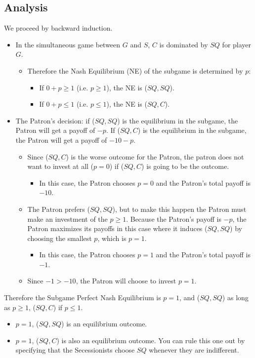 \documentclass[12pt]{article}
\begin{document}
\subsection{Analysis}
We proceed by backward induction.
\begin{itemize}
	\item In the simultaneous game between $G$ and $S$, $C$ is dominated by $SQ$ for player $G$.
		\begin{itemize}
			\item Therefore the Nash Equilibrium (NE) of the subgame is determined by $p$: 
				\begin{itemize}
					\item If $0+p \geq 1$ (i.e. $p \geq 1$), the NE is ($SQ,SQ$).
					\item If $0+p \leq 1$ (i.e. $p \leq 1$), the NE is ($SQ,C$).
				\end{itemize}
		\end{itemize}
	\item The Patron's decision: if ($SQ,SQ$) is the equilibrium in the subgame, the Patron will get a payoff of $-p$. If ($SQ,C$) is the equilibrium in the subgame, the Patron will get a payoff of $-10-p$.
		\begin{itemize}
			\item Since ($SQ,C$) is the worse outcome for the Patron, the patron does not want to invest at all ($p=0$) if ($SQ,C$) is going to be the outcome. 
				\begin{itemize}
					\item In this case, the Patron chooses $p=0$ and the Patron's total payoff is $-10$.
				\end{itemize}
			\item The Patron prefers ($SQ,SQ$), but to make this happen the Patron must make an investment of the $p \geq 1$. Because the Patron's payoff is $-p$, the Patron maximizes its payoffs in this case where it induces ($SQ,SQ$) by choosing the smallest $p$, which is $p=1$. 
				\begin{itemize}
					\item In this case, the Patron chooses $p=1$ and the Patron's total payoff is $-1$.
				\end{itemize}
			\item Since $-1 > -10$, the Patron will choose to invest $p=1$.
		\end{itemize}
\end{itemize}
Therefore the Subgame Perfect Nash Equilibrium is $p=1$, and ($SQ,SQ$) as long as $p \geq 1$, ($SQ,C$) if $p \leq 1$.
\begin{itemize}
	\item $p=1$, ($SQ,SQ$) is an equilibrium outcome.
	\item $p=1$, ($SQ,C$) is also an equilibrium outcome. You can rule this one out by specifying that the Secessionists choose $SQ$ whenever they are indifferent.
\end{itemize}
		
\end{document}
